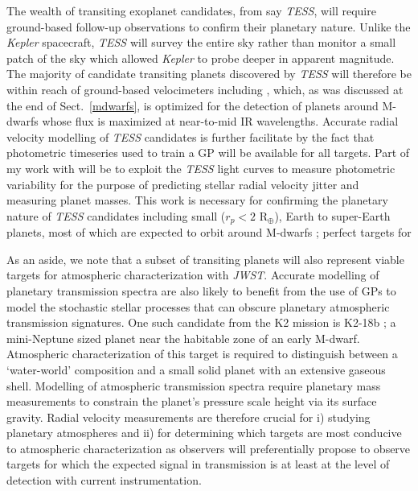 The wealth of transiting exoplanet candidates, from say \emph{TESS}, will 
require ground-based follow-up observations to confirm their planetary nature. 
Unlike the \emph{Kepler} spacecraft, \emph{TESS} will survey the entire sky 
rather than monitor a small patch of the sky which allowed \emph{Kepler} to 
probe deeper in apparent magnitude. The 
majority of candidate transiting planets discovered by \emph{TESS} will 
therefore be within reach of ground-based velocimeters including \spirou{}, 
which, as was discussed at the end of 
Sect.~\ref{mdwarfs}, is optimized for the detection 
of planets around M-dwarfs whose flux is maximized at near-to-mid IR 
wavelengths. Accurate radial velocity modelling of \emph{TESS} candidates is 
further facilitate by the fact that photometric timeseries used to train a GP 
will be available for all targets. Part of my work with \spirou{} will be to 
exploit 
the \emph{TESS} light curves to measure photometric variability for the purpose 
of predicting stellar radial velocity jitter \citep{aigrain12} and measuring 
planet masses. This work is necessary for confirming the planetary nature of 
\emph{TESS} candidates including small ($r_p<2$ R$_{\oplus}$), Earth to 
super-Earth planets, most of which are expected to orbit around M-dwarfs 
\citep{sullivan15}; perfect targets for  

As an aside, we note that a subset of transiting planets will also represent 
viable targets for atmospheric 
characterization with \emph{JWST}. Accurate modelling of planetary transmission 
spectra are also likely to benefit from the use of GPs to model the stochastic 
stellar processes that can obscure planetary atmospheric transmission 
signatures. One such candidate 
from the K2 mission is K2-18b \citep{montet15}; a mini-Neptune sized planet 
near the habitable zone of an early M-dwarf. Atmospheric characterization of 
this target is required to distinguish between a `water-world' composition and 
a small solid planet with an extensive gaseous shell. Modelling of atmospheric 
transmission spectra require planetary mass measurements to constrain the 
planet's pressure scale height via its surface gravity. Radial velocity 
measurements are therefore crucial for i) studying planetary atmospheres and 
ii) for determining which targets are most conducive to atmospheric 
characterization as observers will preferentially propose to observe targets 
for which the expected signal in transmission is at least at the level of 
detection with current instrumentation.

